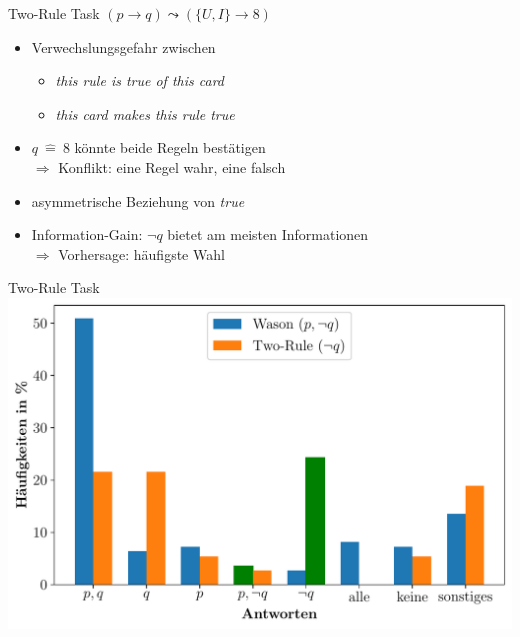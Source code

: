 \begin{frame}{Two-Rule Task {\scriptsize \cite[S.~102-104]{stenningHumanReasoningCognitive2008}}}
    $(p \to q) \leadsto (\{U, I\} \to 8)$

    \begin{itemize}
        \item Verwechslungsgefahr zwischen
        \begin{itemize}
            \item \emph{this rule is \alert{true} of this card}
            \item \emph{this card makes this rule \alert{true}}
        \end{itemize}
        
        \item $q~\hat=~8$ könnte beide Regeln bestätigen \\
            $\Rightarrow$ Konflikt: eine Regel wahr, eine falsch
        
        \item asymmetrische Beziehung von \emph{true}
        
        \item Information-Gain: $\lnot q$ bietet am meisten Informationen \\
            $\Rightarrow$ Vorhersage: häufigste Wahl
    \end{itemize}
\end{frame}


\begin{frame}{Two-Rule Task {\scriptsize \cite[S.~109]{stenningHumanReasoningCognitive2008}}}
    \includegraphics[width=\textwidth]{../plot/results_two_rule.pdf}
\end{frame}



